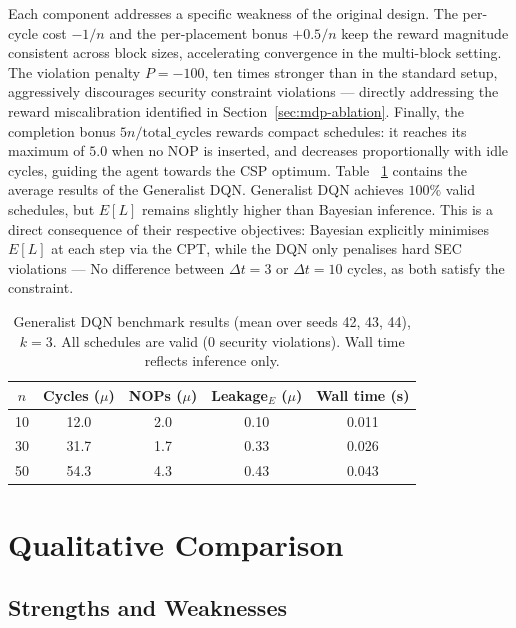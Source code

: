 \documentclass[letterpaper]{article}
\begin{document}
Each component addresses a specific weakness of the original design.
The per-cycle cost $-1/n$ and the per-placement bonus $+0.5/n$
keep the reward magnitude consistent across block sizes,
accelerating convergence in the multi-block setting.
The violation penalty $P = -100$, ten times stronger than in
the standard setup, aggressively discourages security constraint
violations — directly addressing the reward miscalibration
identified in Section~\ref{sec:mdp-ablation}. Finally, the completion
bonus $5n/\text{total\_cycles}$ rewards compact schedules:
it reaches its maximum of $5.0$ when no NOP is inserted,
and decreases proportionally with idle cycles, guiding the
agent towards the CSP optimum.
Table ~\ref{tab:generalist} contains the average results of the Generalist DQN. Generalist DQN achieves $100\%$ valid schedules, but $E[L]$ remains slightly higher than
Bayesian inference. This is a direct consequence of their
respective objectives: Bayesian explicitly minimises
$E[L]$ at each step via the CPT, while the DQN only penalises
hard SEC violations --- No difference between $\Delta t = 3$ or $\Delta t = 10$ cycles, as both satisfy the constraint.
\begin{table}[t]
  \centering
  \begin{tabular}{ccccc}
    \hline
    $n$ & Cycles ($\mu$) & NOPs ($\mu$) & Leakage$_E$ ($\mu$) & Wall time (s) \\
    \hline
    10  & 12.0           & 2.0          & 0.10                & 0.011         \\
    30  & 31.7           & 1.7          & 0.33                & 0.026         \\
    50  & 54.3           & 4.3          & 0.43                & 0.043         \\
    \hline
  \end{tabular}
  \caption{Generalist DQN benchmark results (mean over seeds 42, 43, 44), $k=3$.
    All schedules are valid (0 security violations).
    Wall time reflects inference only.}
  \label{tab:generalist}
\end{table}


\section{Qualitative Comparison}
\label{sec:qualitative}

\subsection{Strengths and Weaknesses}
\end{document}

